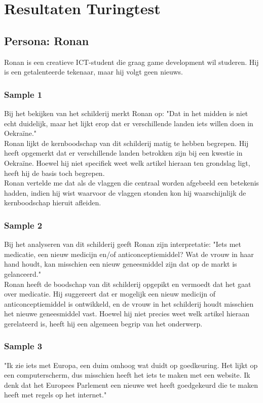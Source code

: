 \section{Resultaten Turingtest}
\label{bijlage:result_turingtest}
\subsection{Persona: Ronan}
Ronan is een creatieve ICT-student die graag game development wil studeren. Hij is een getalenteerde tekenaar, maar hij volgt geen nieuws.
\subsubsection{Sample 1}
Bij het bekijken van het schilderij merkt Ronan op: "Dat in het midden is niet echt duidelijk, maar het lijkt erop dat er verschillende landen iets willen doen in Oekraïne." \\

Ronan lijkt de kernboodschap van dit schilderij matig te hebben begrepen. Hij heeft opgemerkt dat er verschillende landen betrokken zijn bij een kwestie in Oekraïne. Hoewel hij niet specifiek weet welk artikel hieraan ten grondslag ligt, heeft hij de basis toch begrepen.  \\

Ronan vertelde me dat als de vlaggen die centraal worden afgebeeld een betekenis hadden, indien hij wist waarvoor de vlaggen stonden kon hij waarschijnlijk de kernboodschap hieruit afleiden. 

\subsubsection{Sample 2}
Bij het analyseren van dit schilderij geeft Ronan zijn interpretatie: "Iets met medicatie, een nieuw medicijn en/of anticonceptiemiddel? Wat de vrouw in haar hand houdt, kan misschien een nieuw geneesmiddel zijn dat op de markt is gelanceerd." \\

Ronan heeft de boodschap van dit schilderij opgepikt en vermoedt dat het gaat over medicatie. Hij suggereert dat er mogelijk een nieuw medicijn of anticonceptiemiddel is ontwikkeld, en de vrouw in het schilderij houdt misschien het nieuwe geneesmiddel vast. Hoewel hij niet precies weet welk artikel hieraan gerelateerd is, heeft hij een algemeen begrip van het onderwerp. \\

\subsubsection{Sample 3}
"Ik zie iets met Europa, een duim omhoog wat duidt op goedkeuring. Het lijkt op een computerscherm, dus misschien heeft het iets te maken met een website. Ik denk dat het Europees Parlement een nieuwe wet heeft goedgekeurd die te maken heeft met regels op het internet." \\

